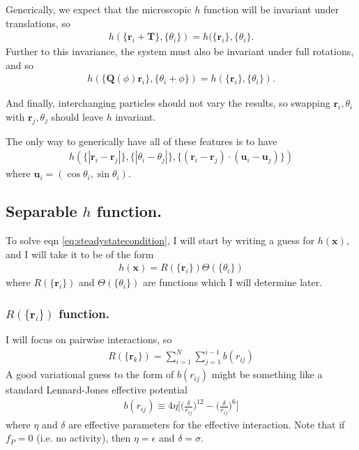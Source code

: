 \documentclass{article}
\begin{document}
Generically, we expect that the microscopic $h$ function will be invariant under translations,
so
\begin{align}
  h(\{\bm{r}_i+\bm{T}\},\{\theta_i\}) = h(\{\bm{r}_i\},\{\theta_i\}.
\end{align}
Further to this invariance, the system must also be invariant
under full rotations, and so
\begin{align}
  h(\{\bm{Q}(\phi)\bm{r}_i\},\{\theta_i+\phi\})
  =h(\{\bm{r}_i\},\{\theta_i\}).
\end{align}

And finally, interchanging particles should not vary the results, so swapping $\bm{r}_i,\theta_i$
with $\bm{r}_j,\theta_j$ should leave $h$ invariant.

The only way to generically have all of these features is to have
\begin{align}
  h(\{|\bm{r}_i-\bm{r}_j|\},\{|\theta_i-\theta_j|\},
  \{(\bm{r}_i-\bm{r}_j)\cdot(\bm{u}_i-\bm{u}_j)\})
\end{align}
where $\bm{u}_i = (\cos\theta_i,\sin\theta_i)$.

\subsection{Separable $h$ function.}

To solve eqn \ref{eq:steadystatecondition}, I will start by writing a guess for $h(\bm{x})$, and I
will take it to be of the form
\begin{align}\label{eq:hgeneric}
  h(\bm{x})=R(\{\bm{r}_i\})\Theta(\{\theta_i\})
\end{align}
where $R(\{\bm{r}_i\})$ and $\Theta(\{\theta_i\})$ are functions which I will determine later.

\subsubsection{$R(\{\bm{r}_i\})$ function.}

I will focus on pairwise interactions, so
\begin{align}
  R(\{\bm{r}_k\})= \sum_{i=1}^N\sum_{j=1}^{i-1}b(r_{ij})
\end{align}
A good variational guess to the form of $b(r_{ij})$ might be something like a standard
Lennard-Jones effective potential
\begin{align}
  b(r_{ij})\equiv 4\eta\bigg[\bigg(\frac{\delta}{r_{ij}}\bigg)^{12}-
  \bigg(\frac{\delta}{r_{ij}}\bigg)^6\bigg]
\end{align}
where $\eta$ and $\delta$ are effective parameters for the effective interaction. Note that if
$f_P=0$ (i.e. no activity), then $\eta=\epsilon$ and $\delta=\sigma$.
\end{document}
